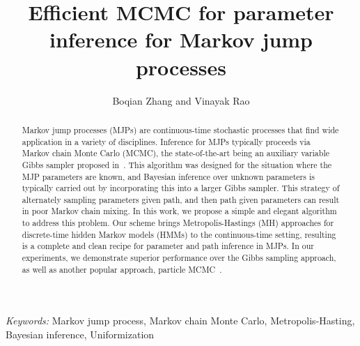 \documentclass{statsoc}
\title[Efficient MCMC for parameter inference for MJPs]{\bf Efficient MCMC for parameter inference for Markov jump processes}
\author{Boqian Zhang and Vinayak Rao}
\begin{document}
\def\spacingset#1{\renewcommand{\baselinestretch}
{#1}\small\normalsize} \spacingset{1}



\begin{abstract}
Markov jump processes (MJPs) are continuous-time stochastic processes that
find wide application in a variety of disciplines. Inference for MJPs typically
proceeds via Markov chain Monte Carlo (MCMC), the state-of-the-art being an auxiliary
variable Gibbs sampler proposed in~\cite{RaoTeh13}. This algorithm was
designed for the situation where the MJP parameters are known, and Bayesian
inference over unknown parameters is typically carried out by incorporating
this into a larger Gibbs sampler.
This strategy of alternately sampling parameters given path, and
then path given parameters can result in poor Markov chain mixing. In this
work, we propose a simple and elegant algorithm to address this
problem. Our scheme brings Metropolis-Hastings (MH) approaches
for discrete-time hidden Markov models (HMMs) to the continuous-time
setting, %
resulting is a complete and clean recipe for
parameter and path inference in MJPs. In our experiments, we
demonstrate superior performance over the Gibbs sampling approach, as well as
another popular approach, particle MCMC~\cite{Andrieu10}.
\end{abstract}
\noindent%
{\it Keywords:}  Markov jump process, Markov chain Monte Carlo, Metropolis-Hasting, Bayesian
inference, Uniformization






%







%
\end{document}
